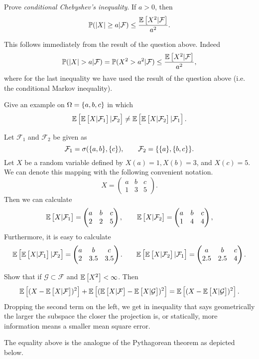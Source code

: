\begin{problem}
	Prove \emph{conditional Chebyshev's inequality}. If $ a>0 $, then
	\[ \mathbb{P}(\left|X\right|\geq a|\mathcal{F}) \leq \frac{\mathbb{E}\left[X^2|\mathcal{F}\right]}{a^2}. \]
\end{problem}
\begin{solution}
	This follows immediately from the result of the question above. Indeed
	\[ \prob(\abs{X}>a|\mathcal{F}) = \prob(X^2>a^2|\mathcal{F}) \leq \frac{\E{X^2|\mathcal{F}}}{a^2}, \]
	where for the last inequality we have used the result of the question above (i.e. the conditional Markov inequality).
\end{solution}

\begin{problem}
	Give an example on $ \Omega = \{a,b,c\} $ in which 
	\[ \mathbb{E}\left[\mathbb{E}\left[X|\mathcal{F}_1\right]|\mathcal{F}_2\right] \neq \mathbb{E}\left[\mathbb{E}\left[X|\mathcal{F}_2\right]|\mathcal{F}_1\right]. \]
\end{problem}
\begin{solution}
	Let $ \mathcal{F}_1 $ and $ \mathcal{F}_2 $ be given as
	\[ \mathcal{F}_1 = \sigma(\{a,b\},\{c\}), \qquad \mathcal{F}_2 = \{\{a\},\{b,c\}\}. \]
	Let $ X $ be a random variable defined by $ X(a) = 1, X(b) = 3$, and $ X(c) = 5 $. We can denote this mapping with the following convenient notation.
	\[ X = \begin{pmatrix}
		a & b & c \\
		1 & 3 & 5
	\end{pmatrix}. \]
	Then we can calculate
	\[ \mathbb{E}\left[X|\mathcal{F}_1\right] = \begin{pmatrix}
		a & b & c \\
		2 & 2&  5
	\end{pmatrix}, \qquad 
	\mathbb{E}\left[X|\mathcal{F}_2\right] = \begin{pmatrix}
		a & b & c \\
		1 & 4 & 4 
	\end{pmatrix}, \]
	Furthermore, it is easy to calculate
	\[ \mathbb{E}\left[\mathbb{E}\left[X|\mathcal{F}_1\right]|\mathcal{F}_2\right] = \begin{pmatrix}
		a & b & c \\
		2 & 3.5 & 3.5
	\end{pmatrix}. \qquad
	\mathbb{E}\left[\mathbb{E}\left[X|\mathcal{F}_2\right]|\mathcal{F}_1\right] = \begin{pmatrix}
		a & b & c \\
		2.5 & 2.5 & 4
	\end{pmatrix}. \]
\end{solution}

\begin{problem}
	Show that if $ \mathcal{G} \subset \mathcal{F} $ and $ \mathbb{E}\left[X^2\right] < \infty $. Then 
	\[ \mathbb{E}\left[(X-\mathbb{E}\left[X|\mathcal{F}\right])^2\right] + \mathbb{E}\left[(\mathbb{E}\left[X|\mathcal{F}\right] - \mathbb{E}\left[X|\mathcal{G}\right])^2\right] = \mathbb{E}\left[(X-\mathbb{E}\left[X|\mathcal{G}\right])^2\right]. \]
	Dropping the second term on the left, we get in inequality that says geometrically the larger the subspace the closer the projection is, or statically, more information means a smaller mean square error.
\end{problem}
\begin{remark}
	The equality above is the analogue of the Pythagorean theorem as depicted below.
	
\end{remark}
